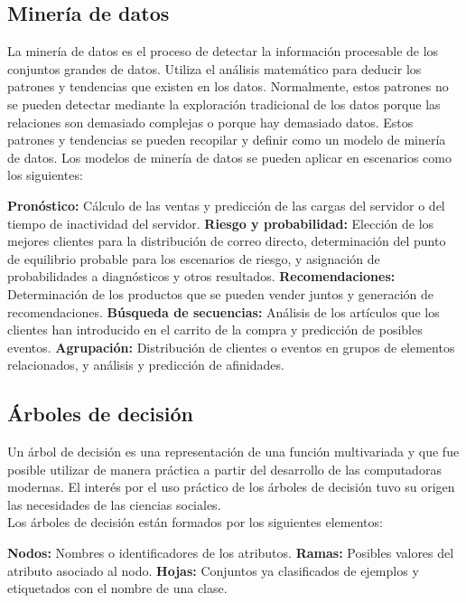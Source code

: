 \subsection{Minería de datos}
La minería de datos es el proceso de detectar la información procesable de los conjuntos grandes de datos. Utiliza el análisis matemático para deducir los patrones y tendencias que existen en los datos. Normalmente, estos patrones no se pueden detectar mediante la exploración tradicional de los datos porque las relaciones son demasiado complejas o porque hay demasiado datos.
Estos patrones y tendencias se pueden recopilar y definir como un modelo de minería de datos. Los modelos de minería de datos se pueden aplicar en escenarios como los siguientes:
\begin{UClist}
	\UCli \textbf{Pronóstico:} Cálculo de las ventas y predicción de las cargas del servidor o del tiempo de inactividad del servidor.
	\UCli \textbf{Riesgo y probabilidad:} Elección de los mejores clientes para la distribución de correo directo, determinación del punto de equilibrio probable para los escenarios de riesgo, y asignación de probabilidades a diagnósticos y otros resultados.
	\UCli \textbf{Recomendaciones:} Determinación de los productos que se pueden vender juntos y generación de recomendaciones.
	\UCli \textbf{Búsqueda de secuencias:} Análisis de los artículos que los clientes han introducido en el carrito de la compra y predicción de posibles eventos.
	\UCli \textbf{Agrupación:} Distribución de clientes o eventos en grupos de elementos relacionados, y análisis y predicción de afinidades.
\end{UClist}

\subsection{Árboles de decisión}
Un árbol de decisión es una representación de una función multivariada y que fue posible utilizar de manera práctica a partir del desarrollo de las computadoras modernas. El interés por el uso práctico de los árboles de decisión tuvo su origen las necesidades de las ciencias sociales.\\

Los árboles de decisión están formados por los siguientes elementos:

\begin{UClist}
	\UCli \textbf{Nodos:} Nombres o identificadores de los atributos.
	\UCli \textbf{Ramas:} Posibles valores del atributo asociado al nodo.
	\UCli \textbf{Hojas:} Conjuntos ya clasificados de ejemplos y etiquetados con el nombre	de una clase. 
\end{UClist}

